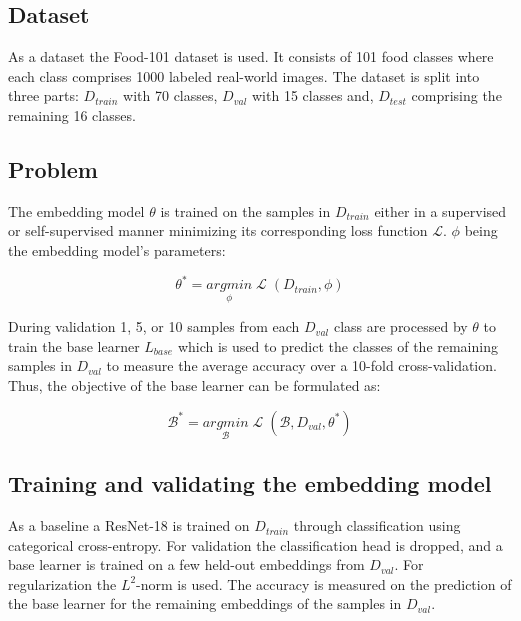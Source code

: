 \subsection{Dataset}
As a dataset the Food-101 dataset \cite{fleet_food-101_2014} is used. It consists of 101 food classes where 
each class comprises 1000 labeled real-world images. The dataset is split into three parts: $D_{train}$ with 70 classes,
$D_{val}$ with 15 classes and, $D_{test}$ comprising the remaining 16 classes.

\subsection{Problem}
The embedding model $\theta$ is trained on the samples in $D_{train}$ either in a supervised or self-supervised manner
minimizing its corresponding loss function $\mathcal{L}$. $\phi$ being the embedding model's parameters:

\begin{equation}
	\theta^*= \underset{\phi}{argmin}\;{\mathcal{L}\;(D_{train}, \phi)}
\end{equation}

During validation 1, 5, or 10 samples from each $D_{val}$ class are processed by $\theta$ to train the 
base learner $L_{base}$ which is used to predict the classes of the remaining samples in $D_{val}$ 
to measure the average accuracy over a 10-fold cross-validation. 
Thus, the objective of the base learner can be formulated as:

\begin{equation}
	\mathcal{B}^* = \underset{\mathcal{B}}{argmin}\;{\mathcal{L}\;(\mathcal{B}, D_{val}, \theta^*)}
\end{equation}

\subsection{Training and validating the embedding model}
As a baseline a ResNet-18 is trained on $D_{train}$ through classification using 
categorical cross-entropy. For validation the classification 
head is dropped, and a base learner is trained on a few held-out embeddings from $D_{val}$. 
For regularization the $L^2$-norm is used. The accuracy is 
measured on the prediction of the base learner for the remaining embeddings of the samples in $D_{val}$.

